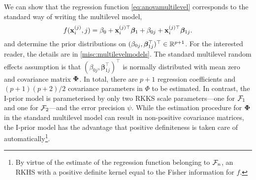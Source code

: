 We can show that the regression function \cref{eq:anovamultilevel} corresponds to the standard way of writing the multilevel model, 
\begin{equation}\label{eq:standmultilevel}
  f({\mathbf x}_i^{(j)}, j) = \beta_0 + {\mathbf x}_i^{(j)\top}\boldsymbol{\beta}_1 + \beta_{0j} + {\mathbf x}_i^{(j)\top}\boldsymbol{\beta}_{1j}.   
\end{equation}
and determine the prior distributions on $(\beta_{0j},\boldsymbol{\beta}_{1j}^\top)^\top \in \mathbb{R}^{p+1}$.
For the interested reader, the details are in \cref{misc:multilevelmodels}.
The standard multilevel random effects assumption is that $(\beta_{0j},\boldsymbol{\beta}_{1j}^\top)^\top$ is normally distributed with mean zero and covariance matrix ${\bm\Phi}$.
In total, there are $p+1$ regression coefficients and $(p+1)(p+2)/2$ covariance parameters in $\Phi$ to be estimated.
In contrast, the I-prior model is parameterised by only two RKKS scale parameters---one for ${\mathcal F}_1$ and one for ${\mathcal F}_2$---and the error precision $\psi$.
While the estimation procedure for ${\bm\Phi}$ in the standard multilevel model can result in non-positive covariance matrices, the I-prior model has the advantage that positive definiteness is taken care of automatically\footnote{By virtue of the estimate of the regression function belonging to ${\mathcal F}_n$, an RKHS with a positive definite kernel equal to the Fisher information for $f$.}.

